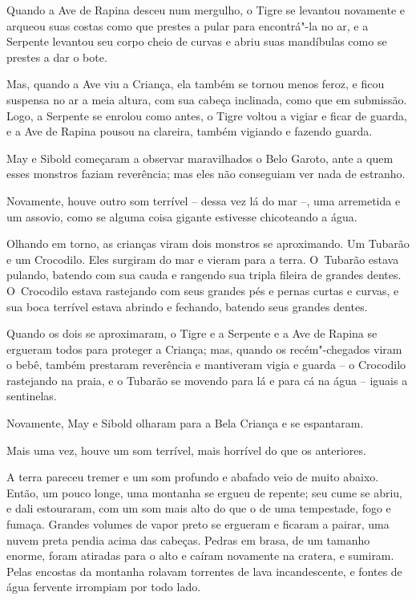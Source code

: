 Quando a Ave de Rapina desceu num mergulho, o Tigre se levantou
novamente e arqueou suas costas como que prestes a pular para
encontrá"-la no ar, e a Serpente levantou seu corpo cheio de curvas e
abriu suas mandíbulas como se prestes a dar o bote.

Mas, quando a Ave viu a Criança, ela também se tornou menos feroz, e
ficou suspensa no ar a meia altura, com sua cabeça inclinada, como que
em submissão. Logo, a Serpente se enrolou como antes, o Tigre voltou a
vigiar e ficar de guarda, e a Ave de Rapina pousou na clareira, também
vigiando e fazendo guarda.

May e Sibold começaram a observar maravilhados o Belo Garoto, ante a
quem esses monstros faziam reverência; mas eles não conseguiam ver nada
de estranho.

Novamente, houve outro som terrível -- dessa vez lá do mar --, uma
arremetida e um assovio, como se alguma coisa gigante estivesse
chicoteando a água.

Olhando em torno, as crianças viram dois monstros se aproximando. Um
Tubarão e um Crocodilo. Eles surgiram do mar e vieram para a terra. O~Tubarão estava pulando, batendo com sua cauda e rangendo sua tripla
fileira de grandes dentes. O~Crocodilo estava rastejando com seus
grandes pés e pernas curtas e curvas, e sua boca terrível estava abrindo
e fechando, batendo seus grandes dentes.

Quando os dois se aproximaram, o Tigre e a Serpente e a Ave de Rapina se
ergueram todos para proteger a Criança; mas, quando os recém"-chegados
viram o bebê, também prestaram reverência e mantiveram vigia e guarda --
o Crocodilo rastejando na praia, e o Tubarão se movendo para lá e para
cá na água -- iguais a sentinelas.

Novamente, May e Sibold olharam para a Bela Criança e se espantaram.

Mais uma vez, houve um som terrível, mais horrível do que os anteriores.

A terra pareceu tremer e um som profundo e abafado veio de muito abaixo.
Então, um pouco longe, uma montanha se ergueu de repente; seu cume se
abriu, e dali estouraram, com um som mais alto do que o de uma
tempestade, fogo e fumaça. Grandes volumes de vapor preto se ergueram e
ficaram a pairar, uma nuvem preta pendia acima das cabeças. Pedras em
brasa, de um tamanho enorme, foram atiradas para o alto e caíram
novamente na cratera, e sumiram. Pelas encostas da montanha rolavam
torrentes de lava incandescente, e fontes de água fervente irrompiam por
todo lado.

